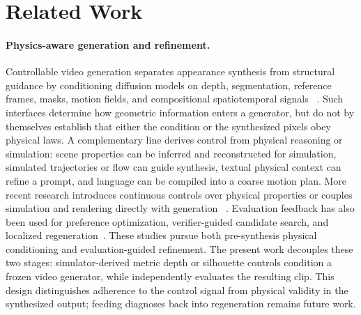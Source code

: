 \section{Related Work}\label{sec:related}

\paragraph{Physics-aware generation and refinement.}
Controllable video generation separates appearance synthesis from structural
guidance by conditioning diffusion models on depth, segmentation, reference
frames, masks, motion fields, and compositional spatiotemporal signals
~\cite{zhang2023controlnet,wang2023videocomposer,wan2025,vace2025}. Such
interfaces determine how geometric information enters a generator, but do not
by themselves establish that either the condition or the synthesized pixels
obey physical laws. A complementary line derives control from physical
reasoning or simulation: scene properties can be inferred and reconstructed for
simulation, simulated trajectories or flow can guide synthesis, textual
physical context can refine a prompt, and language can be compiled into a
coarse motion plan. More recent research introduces continuous controls over
physical properties or couples simulation and rendering directly with generation
~\cite{motioncraft2024,physgen2024,diffphy2025,phyt2v2025,vlipp2025,
phyco2026,psivg2026,moregen2026}. Evaluation feedback has also been used for
preference optimization, verifier-guided candidate search, and localized
regeneration~\cite{aifeedback2024,videot1_2025,videorepair2026}. These studies
pursue both pre-synthesis physical conditioning and evaluation-guided
refinement. The present work decouples these two stages: simulator-derived
metric depth or silhouette controls condition a frozen video generator, while
\PhyReAct{} independently evaluates the resulting clip. This design distinguishes
adherence to the control signal from physical validity in the synthesized
output; feeding diagnoses back into regeneration remains future work.

